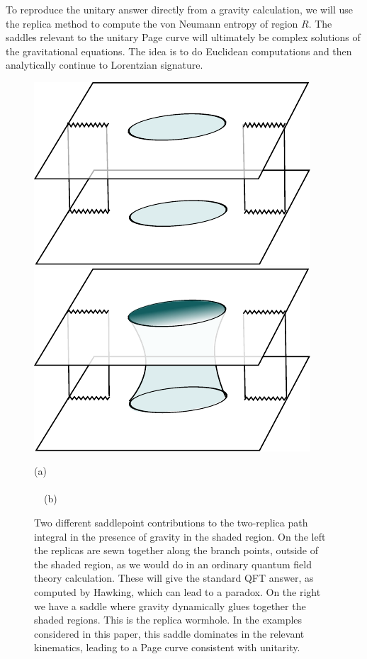 To reproduce the unitary answer directly from a gravity calculation, we will use the replica method to compute the von Neumann entropy of region $R$. The saddles relevant to the unitary Page curve will ultimately be complex solutions of the gravitational equations. The idea is to do Euclidean computations and then analytically continue to Lorentzian signature. 


\begin{figure} 
\begin{center}

\includegraphics[scale=.9]{figures/replica2-hawking.pdf} \hspace{20mm}
\includegraphics[scale=.9]{figures/replica2-wormhole.pdf}  

 (a) ~~~~~~~~~~~~~~~~~~~~~~~~~~~~~~~~~~~~~~~~~~~~~~~~~~~~~~~~~~~~~~(b)
	\end{center}
\caption{\small Two different saddlepoint contributions to the two-replica path integral in the presence of gravity in the shaded region. On the left the replicas are sewn together along the branch points, outside of the shaded region, as we would do in an ordinary quantum field theory calculation. These will give the standard QFT answer, as computed by Hawking, which can lead to a paradox. On the right we have a saddle where gravity dynamically glues together the shaded regions. This is the replica wormhole. In the examples considered in this paper, this saddle dominates in the relevant kinematics, leading to a Page curve consistent with unitarity. \label{fig:2wormhole}}
\end{figure}

